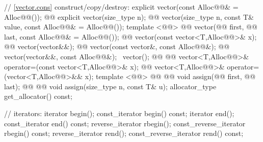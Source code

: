 \documentclass[american,twoside]{book}
\begin{document}
\begin{codeblock}
{{    // \ref{vector.cons} construct/copy/destroy:
    explicit vector(const Alloc@@& = Alloc@@());
    @@ 
      explicit vector(size_type n);
    @@ 
      vector(size_type n, const T& value, const Alloc@@& = Alloc@@());
    template <@@>
      @@
      vector(@@ first, @@ last,
             const Alloc@@& = Alloc@@());
    @@ vector(const vector<T,Alloc@@>& x);
    @@ vector(vector&&);
    @@ vector(const vector&, const Alloc@@&);
    @@ vector(vector&&, const Alloc@@&);
   ~vector();
    @@ @@
      vector<T,Alloc@@>& operator=(const vector<T,Alloc@@>& x);
    @@
      vector<T,Alloc@@>& operator=(vector<T,Alloc@@>&& x);
    template <@@>
      @@
            @@
      void assign(@@ first, @@ last);
    @@ @@
      void assign(size_type n, const T& u);
    allocator_type get_allocator() const;

    // iterators:
    iterator               begin();
    const_iterator         begin() const;
    iterator               end();
    const_iterator         end() const;
    reverse_iterator       rbegin();
    const_reverse_iterator rbegin() const;
    reverse_iterator       rend();
    const_reverse_iterator rend() const;

}}
\end{codeblock}
\end{document}
